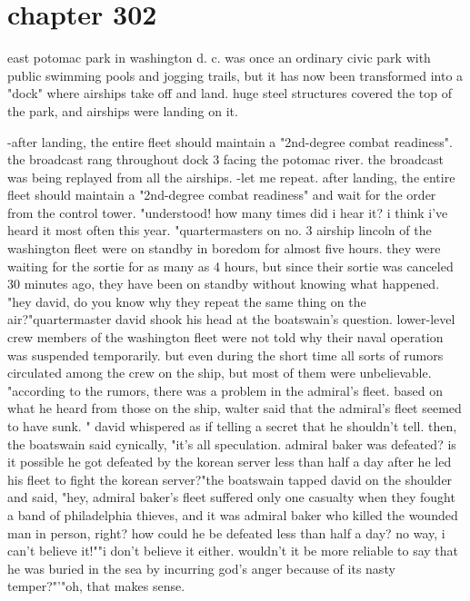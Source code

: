 \section{chapter 302}

east potomac park in washington d.
c.
 was once an ordinary civic park with public swimming pools and jogging trails, but it has now been transformed into a "dock" where airships take off and land.
 huge steel structures covered the top of the park, and airships were landing on it.





-after landing, the entire fleet should maintain a "2nd-degree combat readiness".
the broadcast rang throughout dock 3 facing the potomac river.
 the broadcast was being replayed from all the airships.
-let me repeat.
 after landing, the entire fleet should maintain a "2nd-degree combat readiness" and wait for the order from the control tower.
"understood! how many times did i hear it? i think i've heard it most often this year.
"quartermasters on no.
 3 airship lincoln of the washington fleet were on standby in boredom for almost five hours.
 they were waiting for the sortie for as many as 4 hours, but since their sortie was canceled 30 minutes ago, they have been on standby without knowing what happened.
"hey david, do you know why they repeat the same thing on the air?"quartermaster david shook his head at the boatswain's question.
 lower-level crew members of the washington fleet were not told why their naval operation was suspended temporarily.
but even during the short time all sorts of rumors circulated among the crew on the ship, but most of them were unbelievable.
"according to the rumors, there was a problem in the admiral's fleet.
 based on what he heard from those on the ship, walter said that the admiral's fleet seemed to have sunk.
" david whispered as if telling a secret that he shouldn't tell.
 then, the boatswain said cynically, "it's all speculation.
 admiral baker was defeated? is it possible he got defeated by the korean server less than half a day after he led his fleet to fight the korean server?"the boatswain tapped david on the shoulder and said, "hey, admiral baker's fleet suffered only one casualty when they fought a band of philadelphia thieves, and it was admiral baker who killed the wounded man in person, right? how could he be defeated less than half a day? no way, i can't believe it!""i don't believe it either.
 wouldn't it be more reliable to say that he was buried in the sea by incurring god's anger because of its nasty temper?"'"oh, that makes sense.
